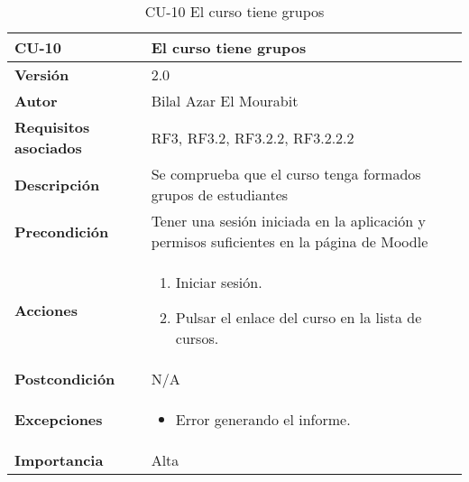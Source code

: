 \begin{table}[H]
	\centering
	\begin{tabularx}{\linewidth}{ p{} p{} }
		\toprule
		\textbf{CU-10}    & \textbf{El curso tiene grupos}\\
		\toprule
		\textbf{Versión}              & 2.0    \\
		\textbf{Autor}                & Bilal Azar El Mourabit \\
		\textbf{Requisitos asociados} & RF3, RF3.2, RF3.2.2, RF3.2.2.2 \\
		\textbf{Descripción}          & Se comprueba que el curso tenga formados grupos de estudiantes\\
    		\textbf{Precondición}         & Tener una sesión iniciada en la aplicación y permisos suficientes en la página de Moodle \\
		\textbf{Acciones}             & 
		\begin{enumerate}
			\def\labelenumi{\arabic{enumi}.}
			\tightlist
			\item Iniciar sesión.
            \item Pulsar el enlace del curso en la lista de cursos. 
		\end{enumerate}\\
		\textbf{Postcondición}        & N/A \\
		\textbf{Excepciones}          & \begin{itemize}
		    \item Error generando el informe.
		\end{itemize} \\
		\textbf{Importancia}          & Alta \\
		\bottomrule
	\end{tabularx}
	\caption{CU-10 El curso tiene grupos}
\end{table}

